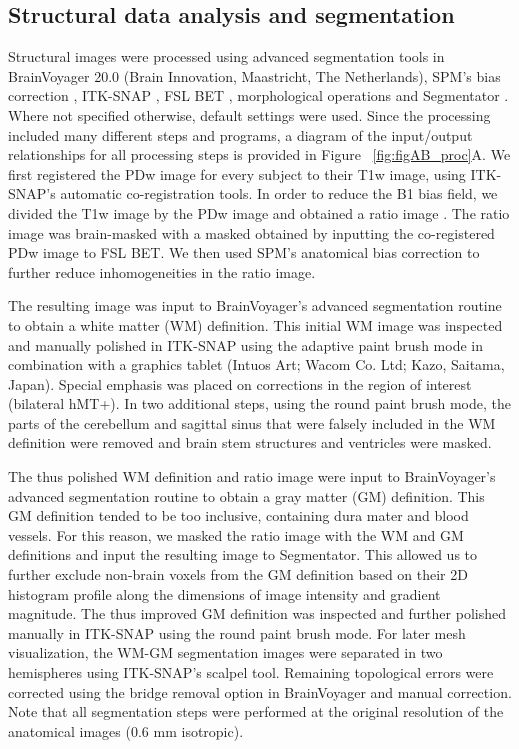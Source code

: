 \subsection{Structural data analysis and segmentation}
Structural images were processed using advanced segmentation tools in BrainVoyager 20.0 (Brain Innovation, Maastricht, The Netherlands), SPM's bias correction \parencite{Ashburner2005}, ITK-SNAP \parencite{py06nimg}, FSL BET \parencite{Smith2002}, morphological operations \parencite{scipy2001} and Segmentator \parencite{Gulban2018a}. Where not specified otherwise, default settings were used. Since the processing included many different steps and programs, a diagram of the input/output relationships for all processing steps is provided in Figure ~\ref{fig:figAB_proc}A. We first registered the PDw image for every subject to their T1w image, using ITK-SNAP's automatic co-registration tools. In order to reduce the B1 bias field, we divided the T1w image by the PDw image and obtained a ratio image \parencite{Moortele2009}. The ratio image was brain-masked with a masked obtained by inputting the co-registered PDw image to FSL BET. We then used SPM's anatomical bias correction to further reduce inhomogeneities in the ratio image.

The resulting image was input to BrainVoyager's advanced segmentation routine to obtain a white matter (WM) definition. This initial WM image was inspected and manually polished in ITK-SNAP using the adaptive paint brush mode in combination with a graphics tablet (Intuos Art; Wacom Co. Ltd; Kazo, Saitama, Japan). Special emphasis was placed on corrections in the region of interest (bilateral hMT+). In two additional steps, using the round paint brush mode, the parts of the cerebellum and sagittal sinus that were falsely included in the WM definition were removed and brain stem structures and ventricles were masked.

The thus polished WM definition and ratio image were input to BrainVoyager's advanced segmentation routine to obtain a gray matter (GM) definition. This GM definition tended to be too inclusive, containing dura mater and blood vessels. For this reason, we masked the ratio image with the WM and GM definitions and input the resulting image to Segmentator. This allowed us to further exclude non-brain voxels from the GM definition based on their 2D histogram profile along the dimensions of image intensity and gradient magnitude. The thus improved GM definition was inspected and further polished manually in ITK-SNAP using the round paint brush mode. For later mesh visualization, the WM-GM segmentation images were separated in two hemispheres using ITK-SNAP's scalpel tool. Remaining topological errors were corrected using the bridge removal option in BrainVoyager \parencite{Kriegeskorte2001} and manual correction. Note that all segmentation steps were performed at the original resolution of the anatomical images (0.6 mm isotropic).

